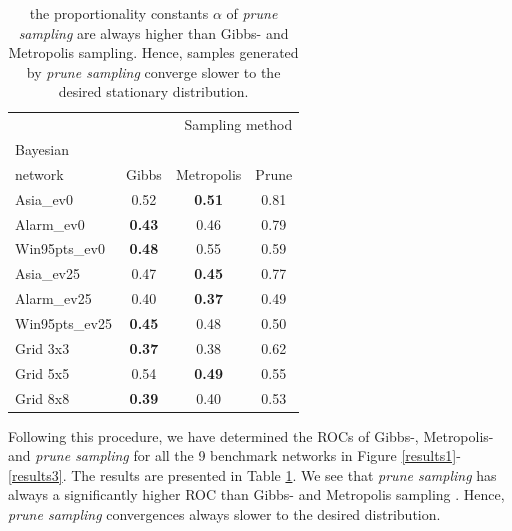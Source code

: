 \documentclass[a4paper, twoside, 11pt]{report}
\theoremstyle{plain}
\theoremstyle{definition}
\theoremstyle{remark}
\newcommand{\ps}{\textit{prune sampling }}
\begin{document}
\begin{center}
\begin{table}[t]
\begin{center}
\begin{tabular}{l c c c}  
\toprule
\multicolumn{4}{r}{Sampling method} \\
\cmidrule(r){2-4}
Bayesian \\ network    & Gibbs    & Metropolis & Prune  \\
\midrule
Asia\_ev0 & 0.52 & \textbf{0.51} & 0.81  \\
Alarm\_ev0 & \textbf{0.43} & 0.46 & 0.79  \\
Win95pts\_ev0 & \textbf{0.48} & 0.55 & 0.59  \\
Asia\_ev25 & 0.47 & \textbf{0.45} & 0.77  \\
Alarm\_ev25 & 0.40 & \textbf{0.37} & 0.49  \\
Win95pts\_ev25 & \textbf{0.45} & 0.48 & 0.50  \\
Grid 3x3 & \textbf{0.37} & 0.38 & 0.62  \\
Grid 5x5 & 0.54 & \textbf{0.49} & 0.55  \\
Grid 8x8 & \textbf{0.39} & 0.40 & 0.53  \\
\bottomrule
\end{tabular}
\caption{the proportionality constants $\alpha$  of \ps are always higher than Gibbs- and Metropolis sampling. Hence, samples generated by \ps converge slower to the desired stationary distribution.}
\label{ROC-table}
\end{center}
\end{table}
\end{center}
Following this procedure, we have determined the ROCs of Gibbs-, Metropolis- and \ps for all the 9 benchmark networks in Figure \ref{results1}-\ref{results3}. The results are presented in Table \ref{ROC-table}. We see that \ps has always a significantly higher ROC than Gibbs- and Metropolis sampling . Hence, \ps convergences always slower to the desired distribution.
\end{document}
